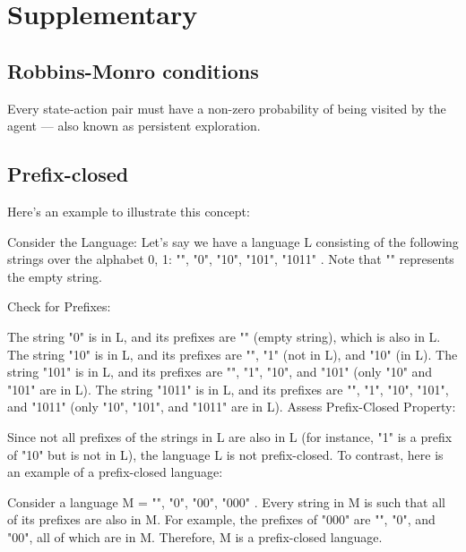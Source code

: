 \documentclass{article}
\begin{document}
\section{Supplementary}
\subsection{Robbins-Monro conditions}
Every state-action pair must have a non-zero probability of being visited by the agent — also known as persistent exploration.
\subsection{Prefix-closed}
Here's an example to illustrate this concept:

Consider the Language: Let's say we have a language L consisting of the following strings over the alphabet {0, 1}: { "", "0", "10", "101", "1011" }. Note that "" represents the empty string.

Check for Prefixes:

The string "0" is in L, and its prefixes are "" (empty string), which is also in L.
The string "10" is in L, and its prefixes are "", "1" (not in L), and "10" (in L).
The string "101" is in L, and its prefixes are "", "1", "10", and "101" (only "10" and "101" are in L).
The string "1011" is in L, and its prefixes are "", "1", "10", "101", and "1011" (only "10", "101", and "1011" are in L).
Assess Prefix-Closed Property:

Since not all prefixes of the strings in L are also in L (for instance, "1" is a prefix of "10" but is not in L), the language L is not prefix-closed.
To contrast, here is an example of a prefix-closed language:

Consider a language M = { "", "0", "00", "000" }.
Every string in M is such that all of its prefixes are also in M. For example, the prefixes of "000" are "", "0", and "00", all of which are in M.
Therefore, M is a prefix-closed language.
\end{document}
